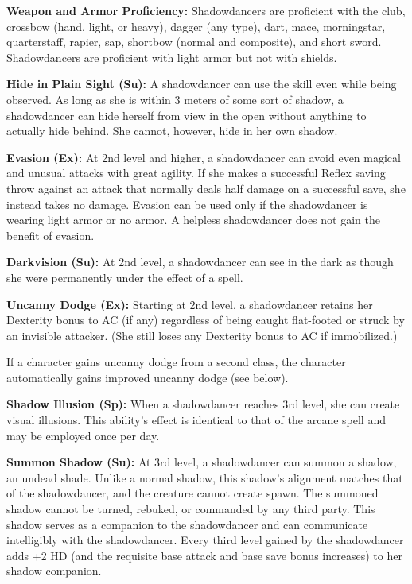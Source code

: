 {
\textbf{Weapon and Armor Proficiency:} Shadowdancers are proficient with the club, crossbow (hand, light, or heavy), dagger (any type), dart, mace, morningstar, quarterstaff, rapier, sap, shortbow (normal and composite), and short sword. Shadowdancers are proficient with light armor but not with shields.

\textbf{Hide in Plain Sight (Su):} A shadowdancer can use the  skill even while being observed. As long as she is within 3 meters of some sort of shadow, a shadowdancer can hide herself from view in the open without anything to actually hide behind. She cannot, however, hide in her own shadow.

\textbf{Evasion (Ex):} At 2nd level and higher, a shadowdancer can avoid even magical and unusual attacks with great agility. If she makes a successful Reflex saving throw against an attack that normally deals half damage on a successful save, she instead takes no damage. Evasion can be used only if the shadowdancer is wearing light armor or no armor. A helpless shadowdancer does not gain the benefit of evasion.

\textbf{Darkvision (Su):} At 2nd level, a shadowdancer can see in the dark as though she were permanently under the effect of a  spell.

\textbf{Uncanny Dodge (Ex):} Starting at 2nd level, a shadowdancer retains her Dexterity bonus to AC (if any) regardless of being caught flat-footed or struck by an invisible attacker. (She still loses any Dexterity bonus to AC if immobilized.)

If a character gains uncanny dodge from a second class, the character automatically gains improved uncanny dodge (see below).

\textbf{Shadow Illusion (Sp):} When a shadowdancer reaches 3rd level, she can create visual illusions. This ability's effect is identical to that of the arcane spell  and may be employed once per day.

\textbf{Summon Shadow (Su):} At 3rd level, a shadowdancer can summon a shadow, an undead shade. Unlike a normal shadow, this shadow's alignment matches that of the shadowdancer, and the creature cannot create spawn. The summoned shadow cannot be turned, rebuked, or commanded by any third party. This shadow serves as a companion to the shadowdancer and can communicate intelligibly with the shadowdancer. Every third level gained by the shadowdancer adds +2 HD (and the requisite base attack and base save bonus increases) to her shadow companion.

}
